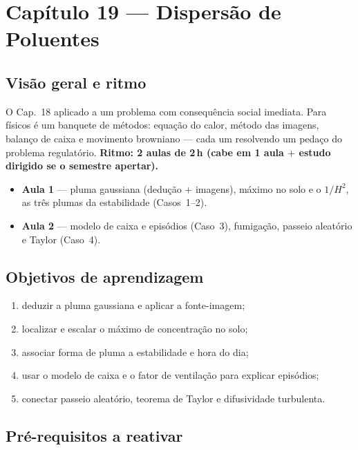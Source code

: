 \section{Capítulo 19 --- Dispersão de Poluentes}

\subsection*{Visão geral e ritmo}

O Cap.~18 aplicado a um problema com consequência social imediata.
Para físicos é um banquete de métodos: equação do calor, método das
imagens, balanço de caixa e movimento browniano — cada um resolvendo
um pedaço do problema regulatório. \textbf{Ritmo: 2 aulas de 2\,h
(cabe em 1 aula $+$ estudo dirigido se o semestre apertar).}

\begin{itemize}
  \item \textbf{Aula 1} — pluma gaussiana (dedução + imagens),
        máximo no solo e o $1/H^2$, as três plumas da estabilidade
        (Casos~1--2).
  \item \textbf{Aula 2} — modelo de caixa e episódios (Caso~3),
        fumigação, passeio aleatório e Taylor (Caso~4).
\end{itemize}

\subsection*{Objetivos de aprendizagem}

\begin{enumerate}
  \item deduzir a pluma gaussiana e aplicar a fonte-imagem;
  \item localizar e escalar o máximo de concentração no solo;
  \item associar forma de pluma a estabilidade e hora do dia;
  \item usar o modelo de caixa e o fator de ventilação para explicar
        episódios;
  \item conectar passeio aleatório, teorema de Taylor e difusividade
        turbulenta.
\end{enumerate}

\subsection*{Pré-requisitos a reativar}

